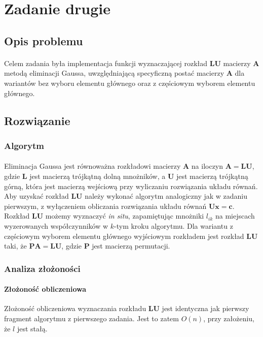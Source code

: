 \documentclass[a4paper]{article}
\begin{document}
\section{Zadanie drugie}

\subsection{Opis problemu}
\paragraph{}
Celem zadania była implementacja funkcji wyznaczającej rozkład $\mathbf{LU}$ macierzy $\mathbf{A}$ metodą eliminacji Gaussa, uwzględniającą specyficzną postać macierzy $\mathbf{A}$ dla wariantów bez wyboru elementu głównego oraz z częściowym wyborem elementu głównego.
\subsection{Rozwiązanie}
\subsubsection{Algorytm}
\paragraph{}
Eliminacja Gaussa jest równoważna rozkładowi macierzy $\mathbf{A}$ na iloczyn $\mathbf{A = LU}$, gdzie $\mathbf{L}$ jest macierzą trójkątną dolną mnożników, a $\mathbf{U}$ jest macierzą trójkątną górną, która jest macierzą wejściową przy wyliczaniu rozwiązania układu równań. Aby uzyskać rozkład $\mathbf{LU}$ należy wykonać algorytm analogiczny jak w zadaniu pierwszym, z wyłączeniem obliczania rozwiązania układu równań $\mathbf{Ux = c}$. Rozkład $\mathbf{LU}$ możemy wyznaczyć \textit{in situ}, zapamiętując mnożniki $l_{i k}$ na miejscach wyzerowanych współczynników w $k$-tym kroku algorytmu. Dla wariantu z częściowym wyborem elementu głównego wyjściowym rozkładem jest rozkład $\mathbf{LU}$ taki, że $\mathbf{PA = LU}$, gdzie $\mathbf{P}$ jest macierzą permutacji.

\subsubsection{Analiza złożoności}
\paragraph{Złożoność obliczeniowa}
Złożoność obliczeniowa wyznaczania rozkładu $\mathbf{LU}$ jest identyczna jak pierwszy fragment algorytmu z pierwszego zadania. Jest to zatem $O(n)$, przy założeniu, że $l$ jest stałą.
\end{document}
